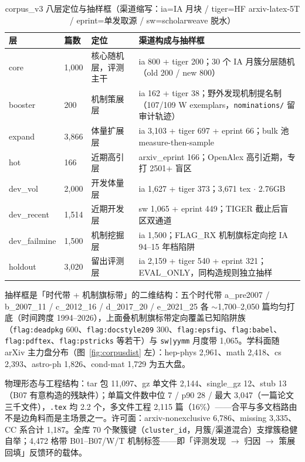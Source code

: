 \begin{table}[htbp]
\centering\small
\caption{corpus\_v3 八层定位与抽样框（渠道缩写：ia=IA 月块 / tiger=HF arxiv-latex-5T / eprint=单发取源 / sw=scholarweave 脱水）}
\label{tab:layers}
\begin{tabular}{@{}ll>{\raggedright\arraybackslash}p{3.4cm}>{\raggedright\arraybackslash}p{6.4cm}@{}}
\toprule
层 & 篇数 & 定位 & 渠道构成与抽样框 \\
\midrule
core & 1{,}000 & 核心随机层，评测主干 & ia 800 + tiger 200；30 个 IA 月簇分层随机（old 200 / new 800） \\
booster & 200 & 机制策展层 & ia 162 + tiger 38；野外发现机制提名制（107/109 W exemplars，\texttt{nominations/} 留审计轨迹） \\
expand & 3{,}866 & 体量扩展层 & ia 3{,}103 + tiger 697 + eprint 66；bulk 池 measure-then-sample \\
hot & 166 & 近期高引层 & arxiv\_eprint 166；OpenAlex 高引近期，专打 2501+ 盲区 \\
dev\_vol & 2{,}000 & 开发体量层 & ia 1{,}627 + tiger 373；3{,}671 tex $\cdot$ 2.76GB \\
dev\_recent & 1{,}514 & 近期开发层 & sw 1{,}065 + eprint 449；TIGER 截止后盲区双通道 \\
dev\_failmine & 1{,}500 & 机制挖掘层 & ia 1{,}500；FLAG\_RX 机制旗标定向挖 IA 94--15 年档陷阱 \\
holdout & 3{,}020 & 留出评测层 & ia 2{,}159 + tiger 540 + eprint 321；EVAL\_ONLY，同构造规则独立抽样 \\
\bottomrule
\end{tabular}
\end{table}

抽样框是「时代带 + 机制旗标带」的二维结构：五个时代带 a\_pre2007 / b\_2007\_11 / c\_2012\_16 / d\_2017\_20 / e\_2021\_25 各 $\sim$1{,}700--2{,}050 篇均匀打底（时间跨度 1994--2026），上面叠机制旗标带定向覆盖已知陷阱族（\texttt{flag:deadpkg} 600、\texttt{flag:docstyle209} 300、\texttt{flag:epsfig}、\texttt{flag:babel}、\texttt{flag:pdftex}、\texttt{flag:pstricks} 等若干）与 \texttt{sw|yymm} 月度带 1{,}065。学科面随 arXiv 主力盘分布（图~\ref{fig:corpusdist} 左）：hep-phys 2{,}961、math 2{,}418、cs 2{,}393、astro-ph 1{,}826、cond-mat 1{,}729 为五大盘。

物理形态与工程结构：tar 包 11{,}097、gz 单文件 2{,}144、single\_gz 12、stub 13（B07 有意构造的残缺件）；单篇文件数中位 7 / p90 28 / 最大 3{,}047（一篇论文三千文件），\texttt{.tex} 均 2.2 个，多文件工程 2{,}115 篇（16\%）——合平与多文档路由不是边角料而是主场景之一。许可面：arxiv-nonexclusive 6{,}786、missing 3{,}335、CC 系合计 1{,}187。全库 70 个聚簇键（\texttt{cluster\_id}，月簇/渠道混合）支撑簇稳健自举；4{,}472 格带 B01--B07/W/T 机制标签——即「评测发现 $\to$ 归因 $\to$ 策展回填」反馈环的载体。

